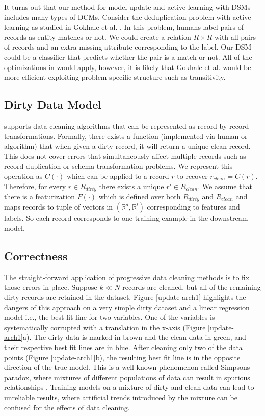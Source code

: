 It turns out that our method for model update and active learning with DSMs includes many types of DCMs.
Consider the deduplication problem with active learning as studied in Gokhale et al. \cite{gokhale2014corleone}.
In this problem, humans label pairs of records as entity matches or not.
We could create a relation $R \times R$ with all pairs of records and an extra missing attribute corresponding to the label. 
Our DSM could be a classifier that predicts whether the pair is a match or not.
All of the optimizations in \sys would apply, however, it is likely that Gokhale et al. would be more efficient exploiting problem specific structure such as transitivity.

\subsection{Dirty Data Model}\label{dmodel}
\sys supports data cleaning algorithms that can be represented as record-by-record transformations.
Formally, there exists a function (implemented via human or algorithm) that when given a dirty record, it will return a unique clean record.
This does not cover errors that simultaneously affect multiple records such as record duplication or schema transformation problems.
We represent this operation as $C(\cdot)$ which can be applied to a record $r$ to recover $r_{clean} = C(r)$.
Therefore, for every $r \in R_{dirty}$ there exists a unique $r' \in R_{clean}$.
We assume that there is a featurization $F(\cdot)$ which is defined over both $R_{dirty}$ and $R_{clean}$ and maps records to tuple of vectors in $(\mathbb{R}^d, \mathbb{R}^l)$ corresponding to features and labels.
So each record corresponds to one training example in the downstream model.

\subsection{Correctness}\label{correctness}  
The straight-forward application of progressive data cleaning methods is to fix those errors in place.
Suppose $k \ll N$ records are cleaned, but all of the remaining dirty records are retained in the dataset.
Figure \ref{update-arch1} highlights the dangers of this approach on a very simple dirty dataset and a linear regression model i.e., the best fit line for two variables. 
One of the variables is systematically corrupted with a translation in the x-axis (Figure \ref{update-arch1}a).
The dirty data is marked in brown and the clean data in green, and their respective best fit lines are in blue.
After cleaning only two of the data points (Figure \ref{update-arch1}b), the resulting best fit line is in the opposite direction of the true model.
This is a well-known phenomenon called Simpsons paradox, where mixtures of different populations of data can result in spurious relationships \cite{simpson1951interpretation}.
Training models on a mixture of dirty and clean data can lead to unreliable results, where artificial trends introduced by the mixture can be confused for the effects of data cleaning.

